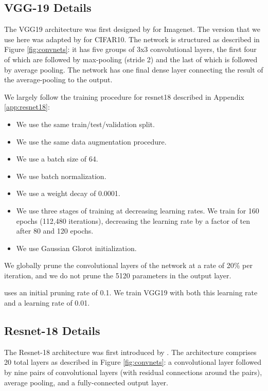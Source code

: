 \subsection{VGG-19 Details}


The VGG19 architecture was first designed by \citet{vgg} for Imagenet. The version that we use here was adapted by
\citet{rethinking-pruning} for CIFAR10. The network is structured as described in Figure \ref{fig:convnets}: it has five groups of 3x3 convolutional layers, the first four
of which are followed by max-pooling (stride 2) and the last of which is followed by average pooling. The network has one final dense layer connecting the result
of the average-pooling to the output.

We largely follow the training procedure for resnet18 described in Appendix \ref{app:resnet18}:
\begin{itemize}
\item We use the same train/test/validation split.
\item We use the same data augmentation procedure.
\item We use a batch size of 64.
\item We use batch normalization.
\item We use a weight decay of 0.0001.
\item We use three stages of training at decreasing learning rates. We train for 160 epochs (112,480 iterations), decreasing the learning rate by a factor of ten
after 80 and 120 epochs.
\item We use Gaussian Glorot initialization.
\end{itemize}

We globally prune the convolutional layers of the network at a rate of 20\% per iteration, and we do not prune the 5120 parameters in the output layer.

\citet{rethinking-pruning} uses an initial pruning rate of 0.1. We train VGG19 with both this learning rate and a learning rate of 0.01.


\subsection{Resnet-18 Details}

The Resnet-18 architecture was first introduced by \citet{resnet}. The architecture comprises 20 total layers as described in Figure \ref{fig:convnets}:
a convolutional layer followed by nine pairs of convolutional layers (with residual connections around the pairs), average pooling, and a fully-connected output layer.

